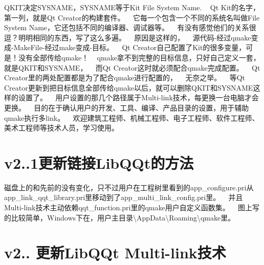 Q\+K\+I\+T决定\+S\+Y\+S\+N\+A\+M\+E，\+S\+Y\+S\+N\+A\+M\+E等于\+Kit File System Name. ~\newline
Qt Kit的名字，第一列，就是\+Qt Creator的构建套件。 ~\newline
它每一个包含一个不同的系统名叫做\+File System Name，它还包括不同的编译器、调试器等。 ~\newline
有没有感觉他们的关系很逗？明明相同的东西，写了这么多遍。 ~\newline
原因是这样的， ~\newline
源代码-\/经过qmake变成-\/\+Make\+File-\/经过make变成-\/目标。 ~\newline
Qt Creator自己配置了\+Kit的很多变量，可是！没有全部传给qmake！ ~\newline
qmake拿不到完整的目标信息，只好自己定义一套，就是\+Q\+K\+I\+T和\+S\+Y\+S\+N\+A\+M\+E， ~\newline
而\+Qt Creator这时就必须配合qmake完成配置。 ~\newline
Qt Creator里的两处配置都是为了配合qmake进行配置的， ~\newline
无奈之举。 ~\newline
等\+Qt Creator更新到把目标信息全部传给qmake以后，就可以删除\+Q\+K\+I\+T和\+S\+Y\+S\+N\+A\+M\+E这样的设置了。 ~\newline
 用户设置的那几个路径属于\+Multi-\/link技术，每更换一台电脑才会更换。 ~\newline
目的在于确认用户的开发、工具、编译、产品目录的设置，用于辅助qmake执行多link。 ~\newline
 欢迎建筑工程师、机械工程师、电子工程师、软件工程师、美术工程师等技术人员，学习使用。 ~\newline
 \section*{v2..\+1更新链接\+Lib\+Q\+Qt的方法}

磁盘上的和先前的没有变化，只不过用户在工程树里看到的app\+\_\+configure.\+pri从app\+\_\+link\+\_\+qqt\+\_\+library.\+pri里移动到了app\+\_\+multi\+\_\+link\+\_\+config.\+pri里。 ~\newline
并且\+Multi-\/link技术主动依赖qqt\+\_\+function.pri里的qmake用户自定义函数集。 ~\newline
图上写的比较简单，\+Windows下在，用户主目录\textbackslash{}App\+Data\textbackslash{}Roaming\textbackslash{}qmake里。  ~\newline
 \section*{v2.. 更新\+Lib\+Q\+Qt Multi-\/link技术}

